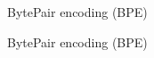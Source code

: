
\begin{vbframe}{BytePair encoding (BPE)}


\end{vbframe}


\begin{vbframe}{BytePair encoding (BPE)}


\end{vbframe}


\endlecture

